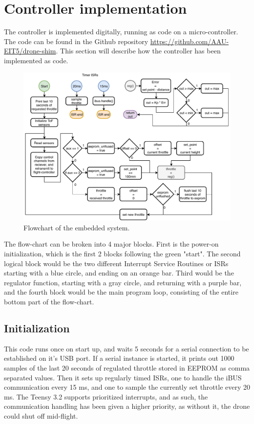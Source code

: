 \section{Controller implementation}\label{sec:control_code}
The controller is implemented digitally, running as code on a micro-controller. The code can be found in the Github repository \url{https://github.com/AAU-EIT5/drone-shim}.
This section will describe how the controller has been implemented as code.

\begin{figure}[H]
    \centering
    \includegraphics[width=1\textwidth]{figures/ch_design/controller/EIT5-code.pdf}
    \caption{Flowchart of the embedded system.}
    \label{fig:code_flowchart}
\end{figure}

The flow-chart can be broken into 4 major blocks. First is the power-on initialization, which is the first 2 blocks following the green "start". The second logical block would be the two different Interrupt Service Routines or ISRs starting with a blue circle, and ending on an orange bar. Third would be the regulator function, starting with a gray circle, and returning with a purple bar, and the fourth block would be the main program loop, consisting of the entire bottom part of the flow-chart.

\subsection*{Initialization}
This code runs once on start up, and waits 5 seconds for a serial connection to be established on it's USB port. If a serial instance is started, it prints out 1000 samples of the last 20 seconds of regulated throttle stored in EEPROM as comma separated values.
Then it sets up regularly timed ISRs, one to handle the iBUS communication every 15 ms, and one to sample the currently set throttle every 20 ms.
The Teensy 3.2 supports prioritized interrupts, and as such, the communication handling has been given a higher priority, as without it, the drone could shut off mid-flight.

